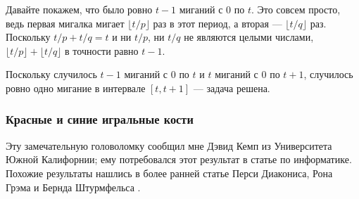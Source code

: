 
Давайте покажем, что было ровно $t - 1$ миганий с $0$ по $t$.
Это совсем просто, ведь первая мигалка мигает $\lfloor t/p\rfloor$ раз в этот период, а вторая --- $\lfloor t/q\rfloor$ раз.
Поскольку $t/p + t/q = t$ и ни $t/p$, ни $t/q$ не являются целыми числами, $\lfloor t/p\rfloor + \lfloor t/q\rfloor$ в точности равно $t - 1$.

Поскольку случилось $t - 1$ миганий с $0$ по $t$ и $t$ миганий с $0$ по $t+1$, случилось ровно одно мигание в интервале $[t,t+1]$ --- задача решена.


%
%
%
%
%
%



\subsubsection*{Красные и синие игральные кости}

Эту замечательную головоломку сообщил мне Дэвид Кемп из Университета Южной Калифорнии; ему потребовался этот результат в статье по информатике.
Похожие результаты нашлись в более ранней статье 
Перси Диакониса, Рона Грэма и Бернда Штурмфельса \cite{14}.

